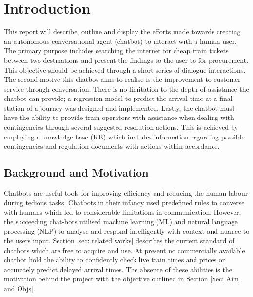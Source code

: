 \section{Introduction}
This report will describe, outline and display the efforts made towards creating an autonomous conversational agent (chatbot) to interact with a human user. The primary purpose includes searching the internet for cheap train tickets between two destinations and present the findings to the user to for procurement. This objective should be achieved through a short series of dialogue interactions. The second motive this chatbot aims to realise is the improvement to customer service through conversation. There is no limitation to the depth of assistance the chatbot can provide; a regression model to predict the arrival time at a final station of a journey was designed and implemented. Lastly, the chatbot must have the ability to provide train operators with assistance when dealing with contingencies through several suggested resolution actions. This is achieved by employing a knowledge base (KB) which includes information regarding possible contingencies and regulation documents with actions within accordance.




\subsection{Background and Motivation}
Chatbots are useful tools for improving efficiency and reducing the human labour during tedious tasks. Chatbots in their infancy used predefined rules to converse with humans which led to considerable limitations in communication. However, the succeeding chat-bots utilised machine learning (ML) and natural language processing (NLP) to analyse and respond intelligently with context and nuance to the users input. Section \ref{sec: related works} describes the current standard of chatbots which are free to acquire and use. At present no commercially available chatbot hold the ability to confidently check live train times and prices or accurately predict delayed arrival times. The absence of these abilities is the motivation behind the project with the objective outlined in Section \ref{Sec: Aim and Objs}.


